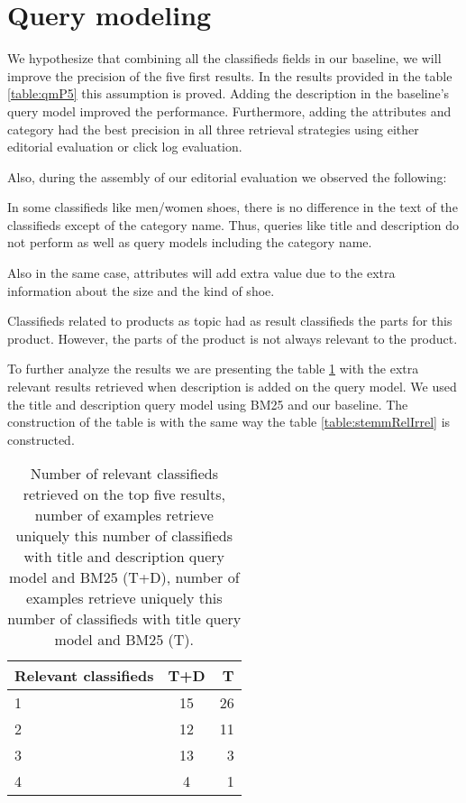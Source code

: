 \section{Query modeling}

We hypothesize that combining all the classifieds fields in our baseline, we will improve the precision of the five first results. In the results provided in the table \ref{table:qmP5} this assumption is proved. Adding the description in the baseline's query model improved the performance. Furthermore, adding the attributes and category had the best precision in all three retrieval strategies using either editorial evaluation or click log evaluation.

Also, during the assembly of our editorial evaluation we observed the following:

\begin{list}{.}{}
\item{In some classifieds like men/women shoes, there is no difference in the text of the classifieds except of the category name. Thus, queries like title and description do not perform as well as query models including the category name.}
\item{Also in the same case, attributes will add extra value due to the extra information about the size and the kind of shoe.}
\item{Classifieds related to products as topic had as result classifieds the parts for this product. However, the parts of the product is not always relevant to the product.}
\end{list}
To further analyze the results we are presenting the table \ref{table:titleVsTD} with the extra relevant results retrieved when description is added on the query model. We used the title and description query model using BM25 and our baseline. The construction of the table is with the same way the table \ref{table:stemmRelIrrel} is constructed.



\begin{table}[H]
\begin{center}
\caption{Number of relevant classifieds retrieved on the top five results, number of examples retrieve uniquely this number of classifieds with title and description query model and BM25 (T+D), number of examples retrieve uniquely this number of classifieds with title query model and BM25 (T).}
\label{table:titleVsTD}
\begin{tabular}{lcr}
\midrule
Relevant classifieds & T+D & T \\
\midrule
	1 & 15 & 26 \\
	2 & 12 & 11  \\
	3 & 13 & 3 \\
	4 & 4 & 1  \\
\bottomrule
\end{tabular}
\end{center}
\end{table}

